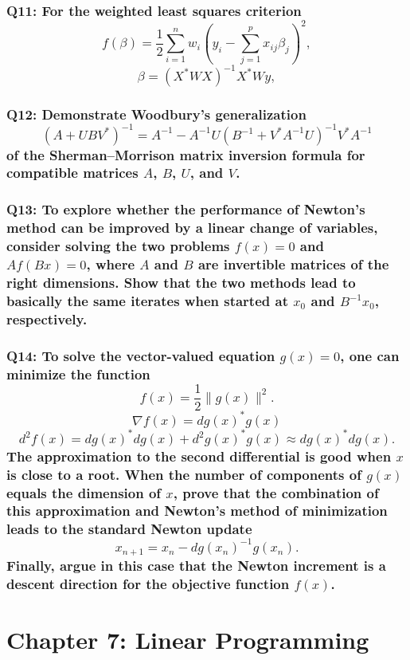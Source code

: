 \documentclass{article}
\begin{document}
\subsubsection*{Q11: For the weighted least squares criterion
\[ f(\beta) = \frac{1}{2} \sum_{i=1}^n w_i \left( y_i - \sum_{j=1}^p x_{ij} \beta_j \right)^2, \]
\[ \beta = (X^* W X)^{-1} X^* W y, \]
}

\subsubsection*{Q12: Demonstrate Woodbury’s generalization
\[ (A + UBV^*)^{-1} = A^{-1} - A^{-1}U(B^{-1} + V^* A^{-1} U)^{-1} V^* A^{-1} \]
of the Sherman–Morrison matrix inversion formula for compatible matrices \(A\), \(B\), \(U\), and \(V\).}

\subsubsection*{Q13: To explore whether the performance of Newton’s method can be improved by a linear change of variables, consider solving the two problems \(f(x) = 0\) and \(Af(Bx) = 0\), where \(A\) and \(B\) are invertible matrices of the right dimensions. Show that the two methods lead to basically the same iterates when started at \(x_0\) and \(B^{-1} x_0\), respectively.}

\subsubsection*{Q14: To solve the vector-valued equation \(g(x) = 0\), one can minimize the function
\[ f(x) = \frac{1}{2} \|g(x)\|^2. \]
\[ \nabla f(x) = dg(x)^* g(x) \]
\[ d^2 f(x) = dg(x)^* dg(x) + d^2 g(x)^* g(x) \approx dg(x)^* dg(x). \]
The approximation to the second differential is good when \(x\) is close to a root. When the number of components of \(g(x)\) equals the dimension of \(x\), prove that the combination of this approximation and Newton’s method of minimization leads to the standard Newton update
\[ x_{n+1} = x_n - dg(x_n)^{-1} g(x_n). \]
Finally, argue in this case that the Newton increment is a descent direction for the objective function \(f(x)\).}

\newpage
\section*{Chapter 7: Linear Programming}
\end{document}
